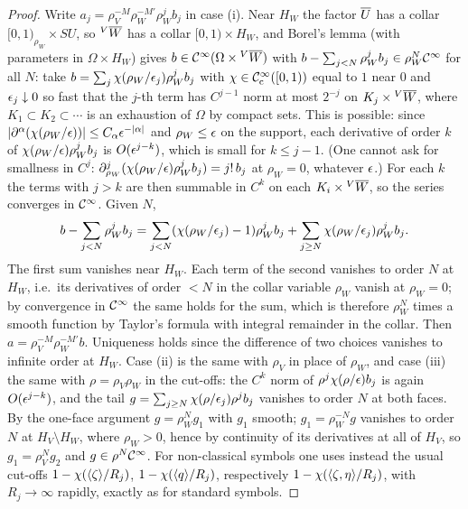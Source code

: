 \begin{proof}
Write $a_j=\rho_V^{-M}\rho_W^{-M'}\rho_W^jb_j$ in case (i). Near $H_W$ the factor
$\overline{U}$ has a collar $[0,1)_{\rho_W}\times SU$, so ${}^{V}\overline{W}$ has a collar
$[0,1)\times H_W$, and Borel's lemma (with parameters in $\Omega\times H_W$) gives
$b\in\mathcal{C}^\infty(\Omega\times{}^{V}\overline{W})$ with $b-\sum_{j<N}\rho_W^jb_j\in\rho_W^N\mathcal{C}^\infty$ for
all $N$: take $b=\sum_j\chi(\rho_W/\epsilon_j)\rho_W^jb_j$ with $\chi\in\mathcal{C}^\infty_{\mathrm{c}}([0,1))$
equal to $1$ near $0$ and $\epsilon_j\downarrow0$ so fast that the $j$-th term has
$C^{j-1}$ norm at most $2^{-j}$ on $K_j\times{}^{V}\overline{W}$, where $K_1\subset
K_2\subset\cdots$ is an exhaustion of $\Omega$ by compact sets. This is possible:
since $|\partial^\alpha(\chi(\rho_W/\epsilon))|\le C_\alpha\epsilon^{-|\alpha|}$ and
$\rho_W\le\epsilon$ on the support, each derivative of order $k$ of
$\chi(\rho_W/\epsilon)\rho_W^jb_j$ is $O(\epsilon^{j-k})$, which is small for $k\le j-1$.
(One cannot ask for smallness in $C^j$: $\partial_{\rho_W}^j(\chi(\rho_W/\epsilon)\rho_W^jb_j)
=j!\,b_j$ at $\rho_W=0$, whatever $\epsilon$.) For each $k$ the terms with $j>k$ are
then summable in $C^k$ on each $K_i\times{}^{V}\overline{W}$, so the series converges in
$\mathcal{C}^\infty$. Given $N$,
\begin{equation*}
b-\sum_{j<N}\rho_W^jb_j=\sum_{j<N}(\chi(\rho_W/\epsilon_j)-1)\rho_W^jb_j
+\sum_{j\ge N}\chi(\rho_W/\epsilon_j)\rho_W^jb_j.
\end{equation*}
The first sum vanishes near $H_W$. Each term of the second vanishes to order $N$
at $H_W$, i.e.\ its derivatives of order $<N$ in the collar variable $\rho_W$
vanish at $\rho_W=0$; by convergence in $\mathcal{C}^\infty$ the same holds for the sum, which
is therefore $\rho_W^N$ times a smooth function by Taylor's formula with integral
remainder in the collar. Then $a=\rho_V^{-M}\rho_W^{-M'}b$. Uniqueness holds since
the difference of two choices vanishes to infinite order at $H_W$. Case (ii) is
the same with $\rho_V$ in place of $\rho_W$, and case (iii) the same with
$\rho=\rho_V\rho_W$ in the cut-offs: the $C^k$ norm of $\rho^j\chi(\rho/\epsilon)b_j$
is again $O(\epsilon^{j-k})$, and the tail $g=\sum_{j\ge N}\chi(\rho/\epsilon_j)\rho^jb_j$
vanishes to order $N$ at both faces. By the one-face argument $g=\rho_W^Ng_1$ with
$g_1$ smooth; $g_1=\rho_W^{-N}g$ vanishes to order $N$ at $H_V\setminus H_W$, where
$\rho_W>0$, hence by continuity of its derivatives at all of $H_V$, so
$g_1=\rho_V^Ng_2$ and $g\in\rho^N\mathcal{C}^\infty$. For non-classical symbols one uses instead the usual
cut-offs $1-\chi(\langle \zeta\rangle/R_j)$, $1-\chi(\langle q\rangle/R_j)$, respectively
$1-\chi(\langle \zeta,\eta\rangle/R_j)$, with $R_j\to\infty$ rapidly, exactly as for
standard symbols.
\end{proof}


